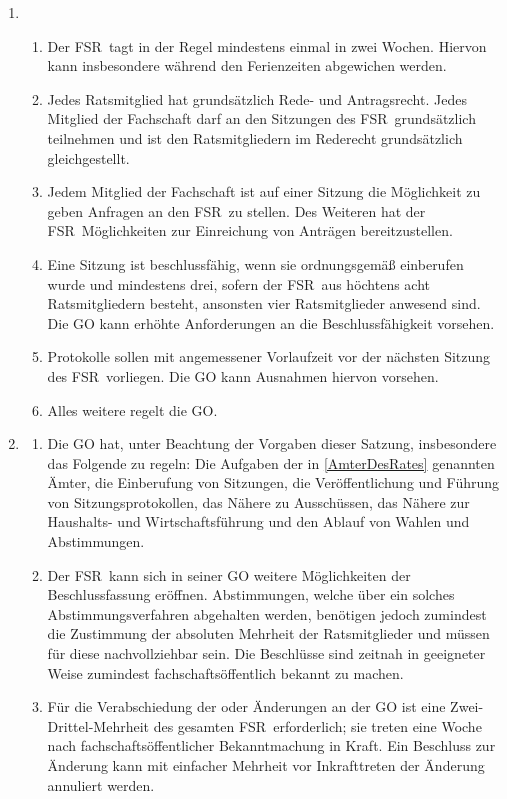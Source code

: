 \documentclass[a4paper, 12pt]{article}
\newcommand{\rat}{FSR}
\newcommand{\rates}{FSR}
\begin{document}
\begin{enumerate}[leftmargin=0cm]
	\item {}
	\begin{enumerate}[leftmargin=0cm]
		\item Der \rat~tagt in der Regel mindestens einmal in zwei Wochen. Hiervon kann insbesondere während den Ferienzeiten abgewichen werden.
		\item Jedes Ratsmitglied hat grundsätzlich Rede- und Antragsrecht. Jedes Mitglied der Fachschaft darf an den Sitzungen des \rates~grundsätzlich teilnehmen und ist den Ratsmitgliedern im Rederecht grundsätzlich gleichgestellt.
		\item Jedem Mitglied der Fachschaft ist auf einer Sitzung die Möglichkeit zu geben Anfragen an den \rat~zu stellen. Des Weiteren hat der \rat~Möglichkeiten zur Einreichung von Anträgen bereitzustellen.
		\item Eine Sitzung ist beschlussfähig, wenn sie ordnungsgemäß einberufen wurde und mindestens drei, sofern der \rat~aus höchtens acht Ratsmitgliedern besteht, ansonsten vier Ratsmitglieder anwesend sind.
		Die GO kann erhöhte Anforderungen an die Beschlussfähigkeit vorsehen.
		\item Protokolle sollen mit angemessener Vorlaufzeit vor der nächsten Sitzung des \rates~vorliegen. Die GO kann Ausnahmen hiervon vorsehen.
		\item Alles weitere regelt die GO.
	\end{enumerate}
			
	\item {}	\label{GOdesRates}
	\begin{enumerate}[leftmargin=0cm]
		\item Die GO hat, unter Beachtung der Vorgaben dieser Satzung, insbesondere das Folgende zu regeln:
		Die Aufgaben der in \cref{AmterDesRates} genannten Ämter,
		die Einberufung von Sitzungen,
		die Veröffentlichung und Führung von Sitzungsprotokollen,
		das Nähere zu Ausschüssen,
		das Nähere zur Haushalts- und Wirtschaftsführung und
		den Ablauf von Wahlen und Abstimmungen.
		\item Der \rat~kann sich in seiner GO weitere Möglichkeiten der Beschlussfassung eröffnen. Abstimmungen, welche über ein solches Abstimmungsverfahren abgehalten werden, benötigen jedoch zumindest die Zustimmung der absoluten Mehrheit der Ratsmitglieder und müssen für diese nachvollziehbar sein. Die Beschlüsse sind zeitnah in geeigneter Weise zumindest fachschaftsöffentlich bekannt zu machen.
		\item Für die Verabschiedung der oder Änderungen an der GO ist eine Zwei-Drittel-Mehrheit des gesamten \rates~erforderlich; sie treten eine Woche nach fachschaftsöffentlicher Bekanntmachung in Kraft. Ein Beschluss zur Änderung kann mit einfacher Mehrheit vor Inkrafttreten der Änderung annuliert werden. 
	\end{enumerate}


\end{enumerate}
\end{document}
